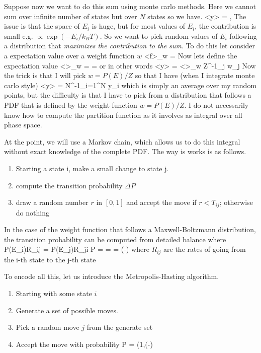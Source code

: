 Suppose now we want to do this sum using monte carlo methods.  Here we cannot sum over infinite number of states but over $N$ states so we have. 
\be
\left<y\right> = ,
\ee
The issue is that the space of $E_i$ is huge, but for most values of $E_i$, the contribution is small e.g. $\propto \exp(-E_i/k_BT)$.  So we want to pick random values of $E_i$ following a distribution that {\it maximizes the contribution to the sum}.  To do this let consider a expectation value over a weight function $w$
\be
\left<f\right>_w = 
\ee
Now lets define the expectation value
\be
\left<\right>_w =  = 
\ee
or in other words 
\be
\left<y\right> = \left<\right>_w Z^{-1}\sum_j w_j
\ee
Now the trick is that I will pick $w = P(E)/Z$ so that I have (when I integrate monte carlo style) 
\be
\left<y\right> = N^{-1}\sum_{i=1}^N y_i
\ee
which is simply an average over my random points, but the difficulty is that I have to pick from a distribution that follows a PDF that is defined by the weight function $w = P(E)/Z$.  I do not necessarily know how to compute the partition function as it involves as integral over all phase space.  

At the point, we will use a Markov chain, which allows us to do this integral without exact knowledge of the complete PDF.  The way is works is as follows.  
\begin{enumerate}
    \item Starting a state i, make a small change to state j.
    \item compute the transition probability $\Delta P$
    \item draw a random number $r$ in $[0,1]$ and accept the move if $r<T_{ij}$; otherwise do nothing
\end{enumerate}
In the case of the weight function that follows a Maxwell-Boltzmann distribution, the transition probability can be computed from detailed balance where 
\be
 P(E_i)R_{ij} = P(E_j)R_{ji} \rightarrow  \Delta P =  =  = \exp\left(-\right)
\ee
where $R_{ij}$ are the rates of going from the i-th state to the j-th state

To encode all this, let us introduce the Metropolis-Hasting algorithm.  
\begin{enumerate}
    \item Starting with some state $i$
    \item Generate a set of possible moves.
    \item Pick a random move $j$ from the generate set
    \item Accept the move with probability 
    \be
    P = \min\left(1,\exp(-\right)
    \ee
\end{enumerate}



